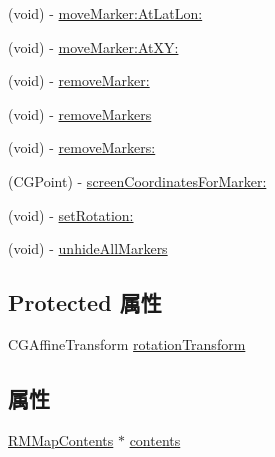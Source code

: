 \begin{DoxyCompactItemize}
\item 
(void) -\/ \hyperlink{interface_r_m_marker_manager_ac179d8f930721478732b25dc78fc6af8}{move\-Marker\-:\-At\-Lat\-Lon\-:}
\item 
(void) -\/ \hyperlink{interface_r_m_marker_manager_a1e774d2df5924a4632f61bd1565fe73a}{move\-Marker\-:\-At\-X\-Y\-:}
\item 
(void) -\/ \hyperlink{interface_r_m_marker_manager_a6f06af69ae8c4d41e114346df170e889}{remove\-Marker\-:}
\item 
(void) -\/ \hyperlink{interface_r_m_marker_manager_acc176d752af4381c94e357c7916707fc}{remove\-Markers}
\item 
(void) -\/ \hyperlink{interface_r_m_marker_manager_ace4f46970fea1660c61ed60c13741b4b}{remove\-Markers\-:}
\item 
(C\-G\-Point) -\/ \hyperlink{interface_r_m_marker_manager_a84726bc335efbd469bb7ac9da60f6641}{screen\-Coordinates\-For\-Marker\-:}
\item 
(void) -\/ \hyperlink{interface_r_m_marker_manager_ab6aa8d10dd932a782eb544d10dd9d3d1}{set\-Rotation\-:}
\item 
(void) -\/ \hyperlink{interface_r_m_marker_manager_ac31f5340920245dd9b6a3068c720fee1}{unhide\-All\-Markers}
\end{DoxyCompactItemize}
\subsection*{Protected 属性}
\begin{DoxyCompactItemize}
\item 
C\-G\-Affine\-Transform \hyperlink{interface_r_m_marker_manager_a1ad3a07eaa130021e43cf400a497e6d3}{rotation\-Transform}
\end{DoxyCompactItemize}
\subsection*{属性}
\begin{DoxyCompactItemize}
\item 
\hyperlink{interface_r_m_map_contents}{R\-M\-Map\-Contents} $\ast$ \hyperlink{interface_r_m_marker_manager_a5e24749c64023fbb7e2e3a161bb8f482}{contents}
\end{DoxyCompactItemize}


